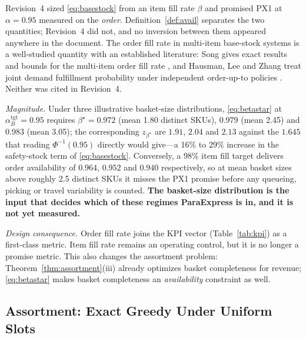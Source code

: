 \begin{remark}
Revision~4 sized \eqref{eq:basestock} from an item fill rate $\beta$ and promised PX1 at $\alpha=0.95$ measured on the \emph{order}. Definition~\ref{def:avail} separates the two quantities; Revision~4 did not, and no inversion between them appeared anywhere in the document. The order fill rate in multi-item base-stock systems is a well-studied quantity with an established literature: Song gives exact results and bounds for the multi-item order fill rate \cite{song1998}, and Hausman, Lee and Zhang treat joint demand fulfillment probability under independent order-up-to policies \cite{hausman1998}. Neither was cited in Revision~4.

\emph{Magnitude.} Under three illustrative basket-size distributions, \eqref{eq:betastar} at $\alpha_B^{\mathrm{tgt}}=0.95$ requires $\beta^\star=0.972$ (mean 1.80 distinct SKUs), $0.979$ (mean 2.45) and $0.983$ (mean 3.05); the corresponding $z_{\beta^\star}$ are $1.91$, $2.04$ and $2.13$ against the $1.645$ that reading $\Phi^{-1}(0.95)$ directly would give---a 16\% to 29\% increase in the safety-stock term of \eqref{eq:basestock}. Conversely, a 98\% item fill target delivers order availability of $0.964$, $0.952$ and $0.940$ respectively, so at mean basket sizes above roughly 2.5 distinct SKUs it misses the PX1 promise before any queueing, picking or travel variability is counted. \textbf{The basket-size distribution is the input that decides which of these regimes ParaExpress is in, and it is not yet measured.} 

\emph{Design consequence.} Order fill rate joins the KPI vector (Table~\ref{tab:kpi}) as a first-class metric. Item fill rate remains an operating control, but it is no longer a promise metric. This also changes the assortment problem: Theorem~\ref{thm:assortment}(iii) already optimizes basket completeness for revenue; \eqref{eq:betastar} makes basket completeness an \emph{availability} constraint as well.
\end{remark}

\subsection{Assortment: Exact Greedy Under Uniform Slots}

